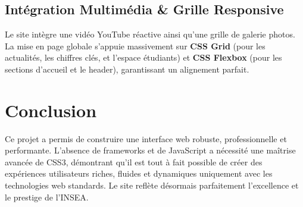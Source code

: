 \documentclass[12pt,a4paper]{article}
\begin{document}
\subsection{Intégration Multimédia \& Grille Responsive}
Le site intègre une vidéo YouTube réactive ainsi qu'une grille de galerie photos. La mise en page globale s'appuie massivement sur \textbf{CSS Grid} (pour les actualités, les chiffres clés, et l'espace étudiants) et \textbf{CSS Flexbox} (pour les sections d'accueil et le header), garantissant un alignement parfait.

\section{Conclusion}
Ce projet a permis de construire une interface web robuste, professionnelle et performante. L'absence de frameworks et de JavaScript a nécessité une maîtrise avancée de CSS3, démontrant qu'il est tout à fait possible de créer des expériences utilisateurs riches, fluides et dynamiques uniquement avec les technologies web standards. Le site reflète désormais parfaitement l'excellence et le prestige de l'INSEA.
\end{document}

